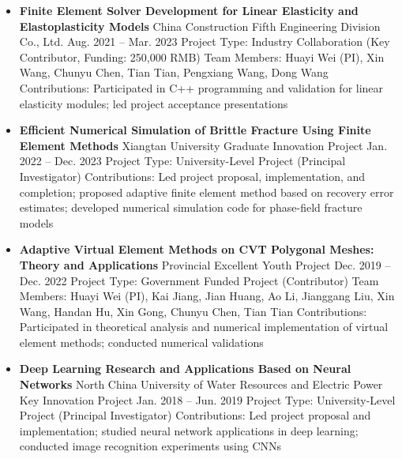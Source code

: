 \documentclass{resume}
\begin{document}
{\begin{itemize}
        \item \textbf{Finite Element Solver Development for Linear Elasticity and Elastoplasticity Models}\newline
        China Construction Fifth Engineering Division Co., Ltd. \hfill Aug. 2021 -- Mar. 2023\newline
        Project Type: Industry Collaboration (Key Contributor, Funding: 250,000 RMB)\newline
        Team Members: Huayi Wei (PI), Xin Wang, Chunyu Chen, Tian Tian, Pengxiang Wang, Dong Wang\newline
        Contributions: Participated in C++ programming and validation for linear elasticity modules; led project acceptance presentations
        
        \item \textbf{Efficient Numerical Simulation of Brittle Fracture Using Finite Element Methods}\newline
        Xiangtan University Graduate Innovation Project \hfill Jan. 2022 -- Dec. 2023\newline
        Project Type: University-Level Project (Principal Investigator)\newline
        Contributions: Led project proposal, implementation, and completion; proposed adaptive finite element method based on recovery error estimates; developed numerical simulation code for phase-field fracture models

        \item \textbf{Adaptive Virtual Element Methods on CVT Polygonal Meshes: Theory and Applications}\newline
        Provincial Excellent Youth Project \hfill Dec. 2019 -- Dec. 2022\newline
        Project Type: Government Funded Project (Contributor)\newline
        Team Members: Huayi Wei (PI), Kai Jiang, Jian Huang, Ao Li, Jianggang Liu, Xin Wang, Handan Hu, Xin Gong, Chunyu Chen, Tian Tian\newline
        Contributions: Participated in theoretical analysis and numerical implementation of virtual element methods; conducted numerical validations
        
        \item \textbf{Deep Learning Research and Applications Based on Neural Networks}\newline
        North China University of Water Resources and Electric Power Key Innovation Project \hfill Jan. 2018 -- Jun. 2019\newline
        Project Type: University-Level Project (Principal Investigator)\newline
        Contributions: Led project proposal and implementation; studied neural network applications in deep learning; conducted image recognition experiments using CNNs
    \end{itemize}
}
\end{document}
